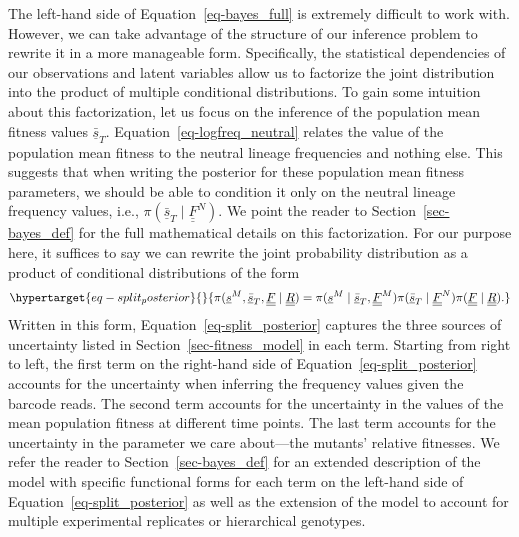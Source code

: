\documentclass[
  letterpaper,
  DIV=11,
  numbers=noendperiod]{scrartcl}
\begin{document}
\begin{refsegment}
The left-hand side of Equation~\ref{eq-bayes_full} is extremely
difficult to work with. However, we can take advantage of the structure
of our inference problem to rewrite it in a more manageable form.
Specifically, the statistical dependencies of our observations and
latent variables allow us to factorize the joint distribution into the
product of multiple conditional distributions. To gain some intuition
about this factorization, let us focus on the inference of the
population mean fitness values \(\underline{\bar{s}}_T\).
Equation~\ref{eq-logfreq_neutral} relates the value of the population
mean fitness to the neutral lineage frequencies and nothing else. This
suggests that when writing the posterior for these population mean
fitness parameters, we should be able to condition it only on the
neutral lineage frequency values, i.e.,
\(\pi(\underline{\bar{s}}_T \mid \underline{\underline{F}}^N)\). We
point the reader to Section~\ref{sec-bayes_def} for the full
mathematical details on this factorization. For our purpose here, it
suffices to say we can rewrite the joint probability distribution as a
product of conditional distributions of the form
\begin{equation}\protect\hypertarget{eq-split_posterior}{}{
\pi(
    \underline{s}^M, \underline{\bar{s}}_T, \underline{\underline{F}} \mid
    \underline{\underline{R}}
) =
\pi(
    \underline{s}^M \mid \underline{\bar{s}}_T, \underline{\underline{F}}^M
)
\pi(
    \underline{\bar{s}}_T \mid \underline{\underline{F}}^N
)
\pi(\underline{\underline{F}} \mid \underline{\underline{R}}).
}\label{eq-split_posterior}\end{equation} Written in this form,
Equation~\ref{eq-split_posterior} captures the three sources of
uncertainty listed in Section~\ref{sec-fitness_model} in each term.
Starting from right to left, the first term on the right-hand side of
Equation~\ref{eq-split_posterior} accounts for the uncertainty when
inferring the frequency values given the barcode reads. The second term
accounts for the uncertainty in the values of the mean population
fitness at different time points. The last term accounts for the
uncertainty in the parameter we care about---the mutants' relative
fitnesses. We refer the reader to Section~\ref{sec-bayes_def} for an
extended description of the model with specific functional forms for
each term on the left-hand side of Equation~\ref{eq-split_posterior} as
well as the extension of the model to account for multiple experimental
replicates or hierarchical genotypes.

\hypertarget{variational-inference}{%
}
\end{refsegment}
\end{document}
